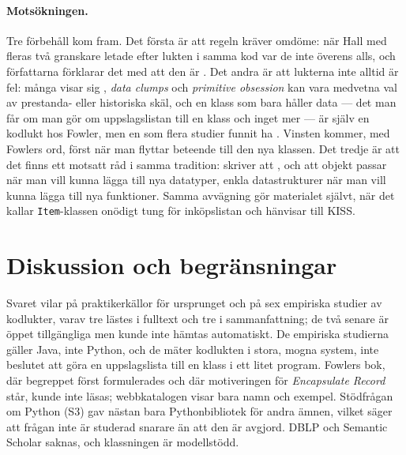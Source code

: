 \paragraph{Motsökningen.}  Tre förbehåll kom fram.  Det första är att
regeln kräver omdöme: när Hall med fleras två granskare letade efter
lukten i samma kod var de inte överens alls, och författarna förklarar
det med att den är .  Det
andra är att lukterna inte alltid är fel: många visar sig
, \emph{data clumps} och
\emph{primitive obsession} kan vara medvetna val av prestanda- eller
historiska skäl, och en klass som bara håller data --- det man får om
man gör om uppslagslistan till en klass och inget mer --- är själv en
kodlukt hos Fowler, men en som flera studier funnit ha
.  Vinsten kommer, med Fowlers ord,
först när man flyttar beteende till den nya klassen.  Det tredje är att
det finns ett motsatt råd i samma tradition:
\textcite{Martin2008CleanCode} skriver att
, och att
objekt passar när man vill kunna lägga till nya datatyper, enkla
datastrukturer när man vill kunna lägga till nya funktioner.  Samma
avvägning gör materialet självt, när det kallar
\texttt{Item}-klassen onödigt tung för inköpslistan och
hänvisar till KISS.

\section{Diskussion och begränsningar}
\label{sec:tum-diskussion}

Svaret vilar på praktikerkällor för ursprunget och på sex empiriska
studier av kodlukter, varav tre lästes i
fulltext\autocite{Hall2014Smells,Soh2016Smells,Fontana2016FalsePositives}
och tre i
sammanfattning\autocite{Pengo2021Primitive,Palomba2018Smells,Baumgartner2025DataClumps};
de två senare är öppet tillgängliga men kunde inte hämtas automatiskt.  De empiriska
studierna gäller Java, inte Python, och de mäter kodlukten i stora,
mogna system, inte beslutet att göra en uppslagslista till en klass i
ett litet program.  Fowlers bok, där begreppet först formulerades och
där motiveringen för \emph{Encapsulate Record} står, kunde inte läsas;
webbkatalogen visar bara namn och exempel.  Stödfrågan om Python (S3)
gav nästan bara Pythonbibliotek för andra ämnen, vilket säger att frågan
inte är studerad snarare än att den är avgjord.  DBLP och Semantic
Scholar saknas, och klassningen är modellstödd.

